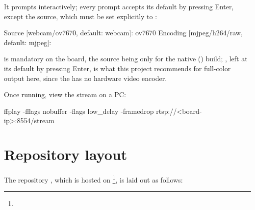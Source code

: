 It prompts interactively; every prompt accepts its default by pressing Enter, except the source, which must be set explicitly to :

\begin{shellcodeboard}
Source [webcam/ov7670, default: webcam]: ov7670
Encoding [mjpeg/h264/raw, default: mjpeg]:
\end{shellcodeboard}

 is mandatory on the board, the  source being only for the native  () build; , left at its default by pressing Enter, is what this project recommends for full-color output here, since the  has no hardware video encoder.

Once running, view the stream on a PC:

\begin{shellcodehost}
ffplay -fflags nobuffer -flags low_delay -framedrop rtsp://<board-ip>:8554/stream
\end{shellcodehost}

\section{Repository layout}

The  repository \cite{FPGALIX-REPO}, which is hosted on \footnote{}, is laid out as follows:

